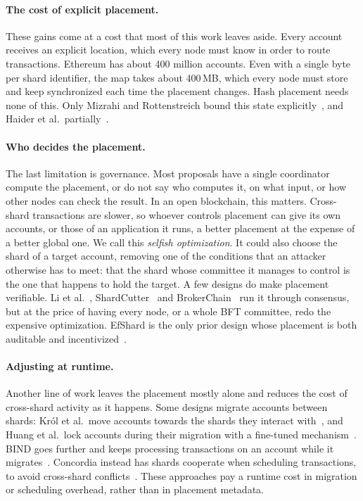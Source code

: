 \paragraph{The cost of explicit placement.}
These gains come at a cost that most of this work leaves aside.
Every account receives an explicit location, which every node must know in order to route transactions.
Ethereum has about 400 million accounts.
Even with a single byte per shard identifier, the map takes about 400\,MB, which every node must store and keep synchronized each time the placement changes. 
Hash placement needs none of this.
Only Mizrahi and Rottenstreich bound this state explicitly~\cite{mizrahi2020blockchain}, and Haider et al.\ partially~\cite{haider2025ai}.

\paragraph{Who decides the placement.}
The last limitation is governance.
Most proposals have a single coordinator compute the placement, or do not say who computes it, on what input, or how other nodes can check the result.
In an open blockchain, this matters.
Cross-shard transactions are slower, so whoever controls placement can give its own accounts, or those of an application it runs, a better placement at the expense of a better global one.
We call this \emph{selfish optimization}.
It could also choose the shard of a target account, removing one of the conditions that an attacker otherwise has to meet: that the shard whose committee it manages to control is the one that happens to hold the target.
A few designs do make placement verifiable.
Li et al.~\cite{li2022achieving}, ShardCutter~\cite{huang2026shardcutter} and BrokerChain~\cite{huang2022brokerchain} run it through consensus, but at the price of having every node, or a whole BFT committee, redo the expensive optimization. 
EfShard is the only prior design whose placement is both auditable and incentivized~\cite{efShard}.

\paragraph{Adjusting at runtime.}
Another line of work leaves the placement mostly alone and reduces the cost of cross-shard activity as it happens.
Some designs migrate accounts between shards: Król et al.\ move accounts towards the shards they interact with~\cite{krol2021shard}, and Huang et al.\ lock accounts during their migration with a fine-tuned mechanism~\cite{huang2024account}.
BIND goes further and keeps processing transactions on an account while it migrates~\cite{qi2026bind}.
Concordia instead has shards cooperate when scheduling transactions, to avoid cross-shard conflicts~\cite{liu2026concordia}.
These approaches pay a runtime cost in migration or scheduling overhead, rather than in placement metadata.

